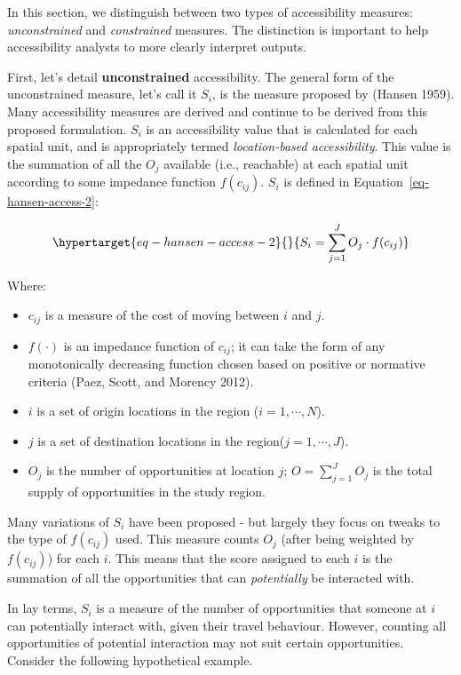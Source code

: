 \documentclass[12pt, oneside]{report}
\providecommand{\tightlist}{%
  \setlength{\itemsep}{0pt}\setlength{\parskip}{0pt}}\usepackage{longtable,booktabs,array}
\begin{document}
In this section, we distinguish between two types of accessibility
measures: \emph{unconstrained} and \emph{constrained} measures. The
distinction is important to help accessibility analysts to more clearly
interpret outputs.

First, let's detail \textbf{unconstrained} accessibility. The general
form of the unconstrained measure, let's call it \(S_i\), is the measure
proposed by (Hansen 1959). Many accessibility measures are derived and
continue to be derived from this proposed formulation. \(S_i\) is an
accessibility value that is calculated for each spatial unit, and is
appropriately termed \emph{location-based accessibility}. This value is
the summation of all the \(O_j\) available (i.e., reachable) at each
spatial unit according to some impedance function \(f(c_{ij})\). \(S_i\)
is defined in Equation~\ref{eq-hansen-access-2}:

\begin{equation}\protect\hypertarget{eq-hansen-access-2}{}{
S_i = \sum_{j=1}^JO_j \cdot f(c_{ij})
}\label{eq-hansen-access-2}\end{equation}

\noindent Where:

\begin{itemize}
\tightlist
\item
  \(c_{ij}\) is a measure of the cost of moving between \(i\) and \(j\).
\item
  \(f(\cdot)\) is an impedance function of \(c_{ij}\); it can take the
  form of any monotonically decreasing function chosen based on positive
  or normative criteria (Paez, Scott, and Morency 2012).
\item
  \(i\) is a set of origin locations in the region (\(i = 1,\cdots,N\)).
\item
  \(j\) is a set of destination locations in the
  region(\(j = 1,\cdots,J\)).
\item
  \(O_j\) is the number of opportunities at location \(j\);
  \(O = \sum_{j=1}^J O_j\) is the total supply of opportunities in the
  study region.
\end{itemize}

Many variations of \(S_i\) have been proposed - but largely they focus
on tweaks to the type of \(f(c_{ij})\) used. This measure counts \(O_j\)
(after being weighted by \(f(c_{ij})\)) for each \(i\). This means that
the score assigned to each \(i\) is the summation of all the
opportunities that can \emph{potentially} be interacted with.

In lay terms, \(S_i\) is a measure of the number of opportunities that
someone at \(i\) can potentially interact with, given their travel
behaviour. However, counting all opportunities of potential interaction
may not suit certain opportunities. Consider the following hypothetical
example.
\end{document}
